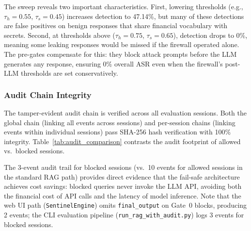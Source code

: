\documentclass[journal]{IEEEtran}
\begin{document}
The sweep reveals two important characteristics. First, lowering thresholds (e.g., $\tau_h = 0.55$, $\tau_s = 0.45$) increases detection to 47.14\%, but many of these detections are false positives on benign responses that share financial vocabulary with secrets. Second, at thresholds above ($\tau_h = 0.75$, $\tau_s = 0.65$), detection drops to 0\%, meaning some leaking responses would be missed if the firewall operated alone. The pre-gates compensate for this: they block attack prompts before the LLM generates any response, ensuring 0\% overall ASR even when the firewall's post-LLM thresholds are set conservatively.

\subsubsection{Audit Chain Integrity}

The tamper-evident audit chain is verified across all evaluation sessions. Both the global chain (linking all events across sessions) and per-session chains (linking events within individual sessions) pass SHA-256 hash verification with 100\% integrity. Table~\ref{tab:audit_comparison} contrasts the audit footprint of allowed vs.\ blocked sessions.

\begin{table}[!ht]
    \centering
    \caption{Audit Chain: Allowed vs.\ Blocked Session Comparison}
    \label{tab:audit_comparison}
\end{table}

The 3-event audit trail for blocked sessions (vs.\ 10 events for allowed sessions in the standard RAG path) provides direct evidence that the fail-safe architecture achieves cost savings: blocked queries never invoke the LLM API, avoiding both the financial cost of API calls and the latency of model inference. Note that the web UI path (\texttt{SentinelEngine}) omits \texttt{final\_output} on Gate~0 blocks, producing 2 events; the CLI evaluation pipeline (\texttt{run\_rag\_with\_audit.py}) logs 3 events for blocked sessions.
\end{document}
